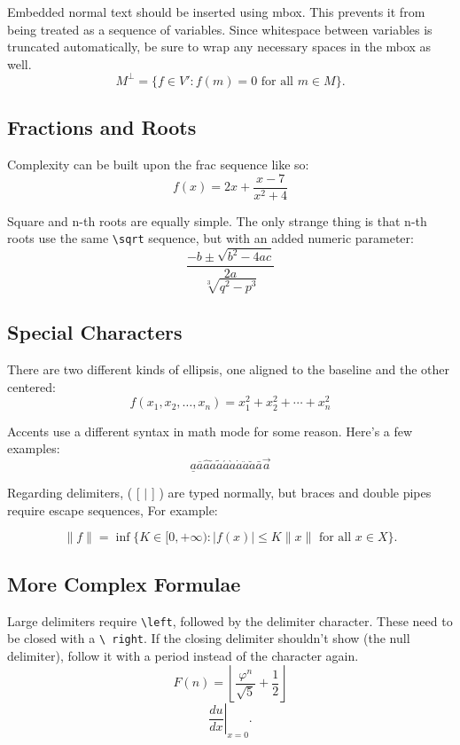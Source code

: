\documentclass[a4paper,12pt]{article}
\begin{document}
Embedded normal text should be inserted using mbox.  This prevents it from
being treated as a sequence of variables.  Since whitespace between variables
is truncated automatically, be sure to wrap any necessary spaces in the mbox as
well.
\[ M^\bot = \{ f \in V' : f(m) = 0 \mbox{ for all } m \in M \}.\]

\subsection{Fractions and Roots}

Complexity can be built upon the frac sequence like so:
\[ f(x) = 2x + \frac{x - 7}{x^2 + 4} \]

Square and n-th roots are equally simple.  The only strange thing is that n-th
roots use the same \texttt{\textbackslash sqrt} sequence, but with an added
numeric parameter:
\[ \frac{-b \pm \sqrt{b^2 - 4ac}}{2a} \]
\[ \sqrt[3]{q^2 - p^3} \]

\subsection{Special Characters}

There are two different kinds of ellipsis, one aligned to the baseline and the
other centered:
\[ f(x_1, x_2,\ldots, x_n) = x_1^2 + x_2^2 + \cdots + x_n^2 \]

Accents use a different syntax in math mode for some reason.  Here's a few
examples: 
\[ \underline{a} \overline{a} \hat{a} \check{a} \tilde{a} \acute{a}
\grave{a} \dot{a} \ddot{a} \breve{a} \bar{a} \vec{a} \]

Regarding delimiters, ( [ $|$ ] ) are typed normally, but braces and double pipes
require escape sequences, For example: 

\[ \|f\| = \inf \{ K \in [0,+\infty) : |f(x)| \leq K \|x\| \mbox{ for all } x
\in X \}.\]

\subsection{More Complex Formulae}
Large delimiters require \texttt{\textbackslash left}, followed by the
delimiter character.  These need to be closed with a \texttt{\textbackslash
  right}.  If the closing delimiter shouldn't show (the null delimiter), follow
it with a period instead of the character again.
\[ F(n) = \left\lfloor \frac{\varphi^n}{\sqrt{5}} + \frac{1}{2} \right\rfloor \]
\[ \left. \frac{du}{dx} \right|_{x=0}.\] 
\end{document}
